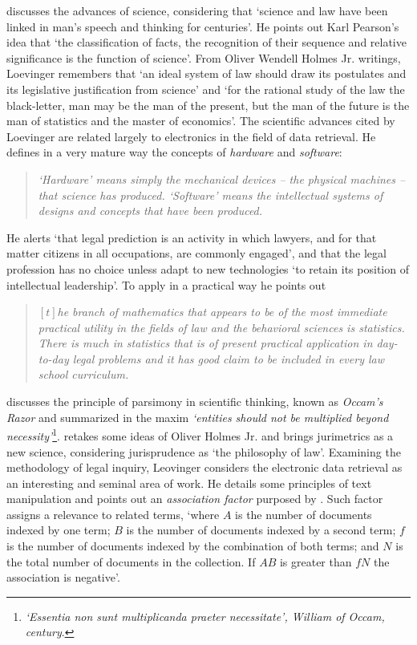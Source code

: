 \documentclass[a4paper]{exam}
\theoremstyle{plain}
\begin{document}
\cite{loevinger1961jurimetrics} discusses the advances of science, considering that `science and law have been linked in man's speech and thinking for centuries'. He points out Karl Pearson's idea that `the classification of facts, the recognition of their sequence and relative significance is the function of science'. From Oliver Wendell Holmes Jr. writings, Loevinger remembers that `an ideal system of law should draw its postulates and its legislative justification from science' and `for the rational study of the law the black-letter, man may be the man of the present, but the man of the future is the man of statistics and the master of economics'. The scientific advances cited by Loevinger are related largely to electronics in the field of data retrieval. He defines in a very mature way the concepts of \textit{hardware} and \textit{software}:
\begin{quote}
\textit{`Hardware' means simply the mechanical devices -- the physical machines -- that science has produced. `Software' means the intellectual systems of designs and concepts that have been produced.} \cite[p. 258]{loevinger1961jurimetrics}
\end{quote}

He alerts `that legal prediction is an activity in which lawyers, and for that matter citizens in all occupations, are commonly engaged', and that the legal profession has no choice unless adapt to new technologies `to retain its position of intellectual leadership'. To apply in a practical way he points out
\begin{quote}
\textit{$\left[t\right]$he branch of mathematics that appears to be of the most immediate practical utility in the fields of law and the behavioral sciences is statistics. There is much in statistics that is of present practical application in day-to-day legal problems and it has good claim to be included in every law school curriculum.} \cite[p. 262]{loevinger1961jurimetrics}
\end{quote}

\cite{loevinger1962occam} discusses the principle of parsimony in scientific thinking, known as \textit{Occam's Razor} and summarized in the maxim \textit{`entities should not be multiplied beyond necessity'}\footnote{ \textit{`Essentia non sunt multiplicanda praeter necessitate', William of Occam,  century}.}. \cite{loevinger1963jurimetrics} retakes some ideas of Oliver Holmes Jr. and brings jurimetrics as a new science, considering jurisprudence as `the philosophy of law'. Examining the methodology of legal inquiry, Leovinger considers the electronic data retrieval as an interesting and seminal area of work. He details some principles of text manipulation and points out an \textit{association factor} purposed by \cite{stiles1961association}. Such factor assigns a relevance to related terms, `where $A$ is the number of documents indexed by one term; $B$ is the number of documents indexed by a second term; $f$ is the number of documents indexed by the combination of both terms; and $N$ is the total number of documents in the collection. If $AB$ is greater than $fN$ the association is negative'.
\end{document}

